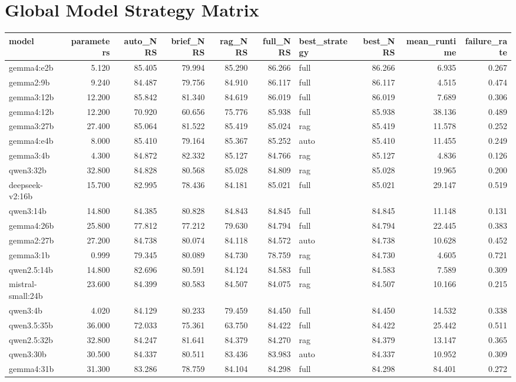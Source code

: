 \documentclass{article}
\begin{document}
\section{Global Model Strategy Matrix}
\begin{tabular}{lrrrrrlrrr}
\toprule
model & parameters & auto\_NRS & brief\_NRS & rag\_NRS & full\_NRS & best\_strategy & best\_NRS & mean\_runtime & failure\_rate \\
\midrule
gemma4:e2b & 5.120 & 85.405 & 79.994 & 85.290 & 86.266 & full & 86.266 & 6.935 & 0.267 \\
gemma2:9b & 9.240 & 84.487 & 79.756 & 84.910 & 86.117 & full & 86.117 & 4.515 & 0.474 \\
gemma3:12b & 12.200 & 85.842 & 81.340 & 84.619 & 86.019 & full & 86.019 & 7.689 & 0.306 \\
gemma4:12b & 12.200 & 70.920 & 60.656 & 75.776 & 85.938 & full & 85.938 & 38.136 & 0.489 \\
gemma3:27b & 27.400 & 85.064 & 81.522 & 85.419 & 85.024 & rag & 85.419 & 11.578 & 0.252 \\
gemma4:e4b & 8.000 & 85.410 & 79.164 & 85.367 & 85.252 & auto & 85.410 & 11.455 & 0.249 \\
gemma3:4b & 4.300 & 84.872 & 82.332 & 85.127 & 84.766 & rag & 85.127 & 4.836 & 0.126 \\
qwen3:32b & 32.800 & 84.828 & 80.568 & 85.028 & 84.809 & rag & 85.028 & 19.965 & 0.200 \\
deepseek-v2:16b & 15.700 & 82.995 & 78.436 & 84.181 & 85.021 & full & 85.021 & 29.147 & 0.519 \\
qwen3:14b & 14.800 & 84.385 & 80.828 & 84.843 & 84.845 & full & 84.845 & 11.148 & 0.131 \\
gemma4:26b & 25.800 & 77.812 & 77.212 & 79.630 & 84.794 & full & 84.794 & 22.445 & 0.383 \\
gemma2:27b & 27.200 & 84.738 & 80.074 & 84.118 & 84.572 & auto & 84.738 & 10.628 & 0.452 \\
gemma3:1b & 0.999 & 79.345 & 80.089 & 84.730 & 78.759 & rag & 84.730 & 4.605 & 0.721 \\
qwen2.5:14b & 14.800 & 82.696 & 80.591 & 84.124 & 84.583 & full & 84.583 & 7.589 & 0.309 \\
mistral-small:24b & 23.600 & 84.399 & 80.583 & 84.507 & 84.075 & rag & 84.507 & 10.166 & 0.215 \\
qwen3:4b & 4.020 & 84.129 & 80.233 & 79.459 & 84.450 & full & 84.450 & 14.532 & 0.338 \\
qwen3.5:35b & 36.000 & 72.033 & 75.361 & 63.750 & 84.422 & full & 84.422 & 25.442 & 0.511 \\
qwen2.5:32b & 32.800 & 84.247 & 81.641 & 84.379 & 84.270 & rag & 84.379 & 13.147 & 0.365 \\
qwen3:30b & 30.500 & 84.337 & 80.511 & 83.436 & 83.983 & auto & 84.337 & 10.952 & 0.309 \\
gemma4:31b & 31.300 & 83.286 & 78.759 & 84.104 & 84.298 & full & 84.298 & 84.401 & 0.272 \\
\bottomrule
\end{tabular}
\end{document}
